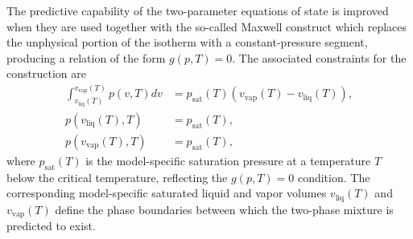 The predictive capability of the two-parameter equations of state is improved when they are used together with the so-called Maxwell construct which replaces the unphysical portion of the isotherm with a constant-pressure segment, producing a relation of the form $g(p,T)=0$. The associated constraints for the construction are
\begin{align}
    \int_{v_\text{liq}(T)}^{v_\text{vap}(T)} p(v,T)dv&=p_\text{sat}(T)(v_\text{vap}(T)-v_\text{liq}(T)),\\
    p(v_\text{liq}(T),T)&=p_\text{sat}(T),\\
    p(v_\text{vap}(T),T)&=p_\text{sat}(T),
\end{align}
where $p_\text{sat}(T)$ is the model-specific saturation pressure at a temperature $T$ below the critical temperature, reflecting the $g(p,T)=0$ condition. The corresponding model-specific saturated liquid and vapor volumes $v_\text{liq}(T)$ and $v_\text{vap}(T)$ define the phase boundaries between which the two-phase mixture is predicted to exist.

